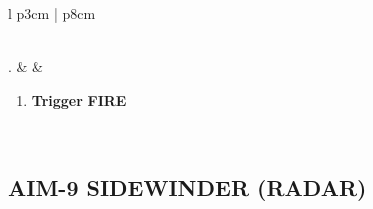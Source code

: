 \documentclass[8pt,usenames,dvipsnames,twoside]{article}
\begin{document}
\begin{center}
\begin{tabular}{l p{3cm} | p{8cm}}
\begin{minipage}[t]{\linewidth}
				\end{minipage} \\
				. &  & 
				\begin{minipage}[t]{\linewidth}
					\vspace{-7pt}
					\begin{enumerate}[label=(\alph*)]
						\item \textbf{Trigger} \dotfill \textbf{FIRE}
					\end{enumerate}
				\end{minipage} \\
				\bottomrule
			\end{tabular}
		\end{center}
		
		\subsection{AIM-9 SIDEWINDER (RADAR)}
\end{document}

